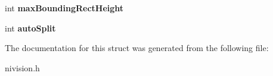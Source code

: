 \begin{DoxyCompactItemize}
\item 
\hypertarget{structOCRSpacingOptions__struct_ae7f9dfc75bcc5c972792fc86adf41a1f}{
int {\bfseries maxBoundingRectHeight}}
\label{structOCRSpacingOptions__struct_ae7f9dfc75bcc5c972792fc86adf41a1f}

\item 
\hypertarget{structOCRSpacingOptions__struct_a9f296474a7818b6695d55225fc0052d1}{
int {\bfseries autoSplit}}
\label{structOCRSpacingOptions__struct_a9f296474a7818b6695d55225fc0052d1}

\end{DoxyCompactItemize}


The documentation for this struct was generated from the following file:\begin{DoxyCompactItemize}
\item 
nivision.h\end{DoxyCompactItemize}
